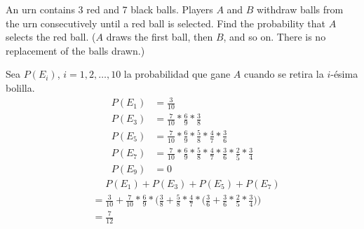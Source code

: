 \item An urn contains 3 red and 7 black balls. Players $A$ and $B$ withdraw balls from the urn consecutively until a red ball is selected. Find the probability that $A$ selects the red ball. ($A$ draws the first ball, then $B$, and so on. There is no replacement of the balls drawn.)

Sea $P(E_i)$, $i = 1,2,\dots,10$ la probabilidad que gane $A$ cuando se retira la $i$-ésima bolilla.
\begin{align*}
    P(E_1) &= \frac{3}{10}\\
    P(E_3) &= \frac{7}{10} * \frac{6}{9} * \frac{3}{8}\\
    P(E_5) &= \frac{7}{10} * \frac{6}{9} * \frac{5}{8} * \frac{4}{7} * \frac{3}{6}\\
    P(E_7) &= \frac{7}{10} * \frac{6}{9} * \frac{5}{8} * \frac{4}{7} * \frac{3}{6} * \frac{2}{5} * \frac{3}{4}\\
    P(E_9) &= 0
\end{align*}
\begin{align*}
    &\phantom{{}={}} P(E_1) + P(E_3) + P(E_5) + P(E_7)\\
    &= \frac{3}{10} + \frac{7}{10} * \frac{6}{9} * \Big( \frac{3}{8} + \frac{5}{8} * \frac{4}{7} * \Big(\frac{3}{6} + \frac{3}{6} * \frac{2}{5} * \frac{3}{4}\Big)\Big)\\
    &= \frac{7}{12}
\end{align*}